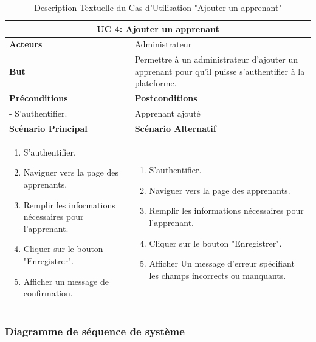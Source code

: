 \newpage

\begin{minipage}{\textwidth}
\begin{table}[H]
\centering
\begin{tabular}{| m{8cm} | m{8cm} |}
\hline
\multicolumn{2}{|c|}{\textbf{UC 4:} Ajouter un apprenant} \\ \hline
\textbf{Acteurs} & Administrateur \\ \hline
\textbf{But} & Permettre à un administrateur d'ajouter un apprenant pour qu'il puisse s'authentifier à la plateforme. \\ \hline
\textbf{Préconditions} & \textbf{Postconditions} \\ \hline
- S'authentifier. & Apprenant ajouté \\ \hline
\textbf{Scénario Principal} & \textbf{Scénario Alternatif} \\ \hline
\begin{enumerate}
    \item S'authentifier.
    \item Naviguer vers la page des apprenants.
    \item Remplir les informations nécessaires pour l'apprenant.
    \item Cliquer sur le bouton "Enregistrer".
    \item Afficher un message de confirmation.
\end{enumerate} & 
\begin{enumerate}
    \item S'authentifier.
    \item Naviguer vers la page des apprenants.
    \item Remplir les informations nécessaires pour l'apprenant.
    \item Cliquer sur le bouton "Enregistrer".
    \item Afficher Un message d'erreur spécifiant les champs incorrects ou manquants.
\end{enumerate} \\ \hline
\end{tabular}
\caption{Description Textuelle du Cas d'Utilisation "Ajouter un apprenant"}
\label{tab:use_case_description_4}
\end{table}
\end{minipage}




\subsubsection{Diagramme de séquence de système}

